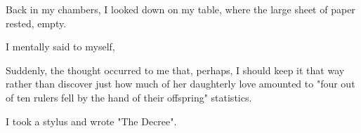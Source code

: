 
Back in my chambers, I looked down on my table, where the large sheet of paper rested, empty.

 I mentally said to myself, 

Suddenly, the thought occurred to me that, perhaps, I should keep it that way rather than discover just how much of her daughterly love amounted to "four out of ten rulers fell by the hand of their offspring" statistics.

I took a stylus and wrote "The Decree".

